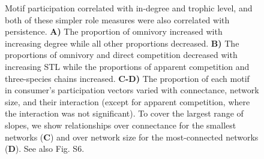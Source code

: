\documentclass[12pt]{article}
\begin{document}
\begin{spacing}{2.0}
    \begin{figure}[hb!]
        \centering
        \caption{Motif participation correlated with in-degree and trophic level, and both of these simpler role measures were also correlated with persistence. \textbf{A)} The proportion of omnivory increased with increasing degree while all other proportions decreased. \textbf{B)} The proportions of omnivory and direct competition decreased with increasing STL while the proportions of apparent competition and three-species chains increased. \textbf{C-D)} The proportion of each motif in consumer's participation vectors varied with connectance, network size, and their interaction (except for apparent competition, where the interaction was not significant). To cover the largest range of slopes, we show relationships over connectance for the smallest networks (\textbf{C}) and over network size for the most-connected networks (\textbf{D}). See also Fig. S6.}
        \label{fig:motifs_vs_TL_and_deg}
    \end{figure}        

\end{spacing}
\end{document}
